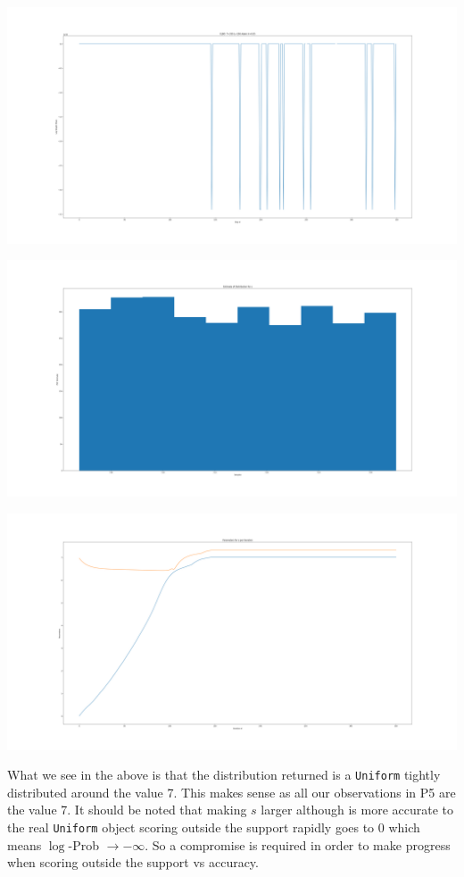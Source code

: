 \documentclass[]{article}
\begin{document}
\begin{center}
	\includegraphics[width=\linewidth]{Figures/elbo_5Adam.png}
\end{center}
\begin{center}
	\includegraphics[width=\linewidth]{Figures/pdfEstP5.png}
\end{center}
\begin{center}
	\includegraphics[width=\linewidth]{Figures/estParamsP5.png}
\end{center}
What we see in the above is that the distribution returned is a \texttt{Uniform} tightly distributed around the value 7. This makes sense as all our observations in P5 are the value 7. It should be noted that making $s$ larger although is more accurate to the real \texttt{Uniform} object scoring outside the support rapidly goes to 0 which means $\log$-Prob $\rightarrow -\infty$. So a compromise is required in order to make progress when scoring outside the support vs accuracy. 
\end{document}
